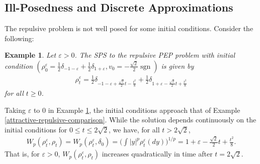 \documentclass[11pt]{article}
\newtheorem{example}[theorem]{Example}
\numberwithin{equation}{section}
\DeclareMathOperator{\sgn}{sgn}
\begin{document}
    \subsection{Ill-Posedness and Discrete Approximations}
        The repulsive problem is not well posed for some initial conditions. Consider the following:
        \begin{example}\label{ill-posed}
            Let $\varepsilon>0$. The SPS to the repulsive PEP problem with initial condition $(\rho_0^\varepsilon=\frac{1}{2}\delta_{-1-\varepsilon}+\frac{1}{2}\delta_{1+\varepsilon},v_0=-\frac{\sqrt{2}}{2}\sgn)$ is given by 
            \begin{align*}
                \rho_t^\varepsilon=\frac{1}{2}\delta_{-1-\varepsilon+\frac{\sqrt{2}}{2}t-\frac{t^2}{8}}+\frac{1}{2}\delta_{1+\varepsilon-\frac{\sqrt{2}}{2}t+\frac{t^2}{8}}
            \end{align*}
            for all $t\geq0$. 
        \end{example}
        Taking $\varepsilon$ to $0$ in Example \ref{ill-posed}, the initial conditions approach that of Example \ref{attractive-repulsive-comparison}. While the solution depends continuously on the initial conditions for $0\leq t\leq2\sqrt{2}$, we have, for all $t>2\sqrt{2}$, 
        \begin{align*}
            W_p(\rho_t^\varepsilon,\rho_t)=W_p(\rho_t^\varepsilon,\delta_0)=\Bigg(\int|y|^p\rho_t^\varepsilon(dy)\Bigg)^{1/p}=1+\varepsilon-\frac{\sqrt{2}}{2}t+\frac{t^2}{8}. 
        \end{align*}
        That is, for $\varepsilon>0$, $W_p(\rho_t^\varepsilon,\rho_t)$ increases quadratically in time after $t=2\sqrt{2}$. 
\end{document}
